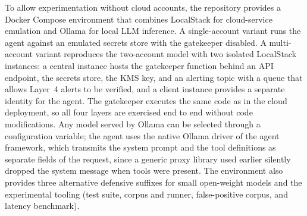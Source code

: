 To allow experimentation without cloud accounts, the repository provides a Docker Compose environment that combines LocalStack for cloud-service emulation and Ollama for local LLM inference. A single-account variant runs the agent against an emulated secrets store with the gatekeeper disabled. A multi-account variant reproduces the two-account model with two isolated LocalStack instances: a central instance hosts the gatekeeper function behind an API endpoint, the secrets store, the KMS key, and an alerting topic with a queue that allows Layer~4 alerts to be verified, and a client instance provides a separate identity for the agent. The gatekeeper executes the same code as in the cloud deployment, so all four layers are exercised end to end without code modifications. Any model served by Ollama can be selected through a configuration variable; the agent uses the native Ollama driver of the agent framework, which transmits the system prompt and the tool definitions as separate fields of the request, since a generic proxy library used earlier silently dropped the system message when tools were present. The environment also provides three alternative defensive suffixes for small open-weight models and the experimental tooling (test suite, corpus and runner, false-positive corpus, and latency benchmark).
